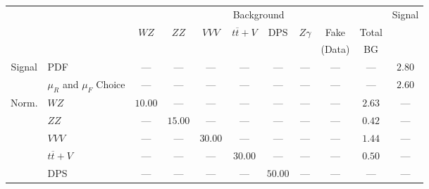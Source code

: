 \small\renewcommand{\tabcolsep}{4pt}
\begin{tabular}{|cl||ccccccc|c||c|}
\hline
 & & \multicolumn{8}{c||}{Background} & Signal \\ 
 & & $WZ$ & $ZZ$ & $VVV$ & $t\overline{t}+V$ & DPS & $Z\gamma$ & Fake & Total & \\ 
 & & &  &  &  &  &  & (Data) & BG & \\ 
\hline\hline
\multirow{2}{*}{Signal}
&PDF & --- & --- & --- & --- & --- & --- & --- & --- &  $2.80$ \\ 
\cline{2-11}
& $\mu_{R}$ and $\mu_{F}$ Choice &  --- &  --- &  --- &  --- &  --- &  --- &  --- &  --- & $2.60$\\ 
\hline
\multirow{5}{*}{Norm.}
& $WZ$ & $10.00$&  --- &  --- &  --- &  --- &  --- &  --- & $2.63$&  ---\\ 
\cline{2-11}
& $ZZ$ &  --- & $15.00$&  --- &  --- &  --- &  --- &  --- & $0.42$&  ---\\ 
\cline{2-11}
& $VVV$ &  --- &  --- & $30.00$&  --- &  --- &  --- &  --- & $1.44$&  ---\\ 
\cline{2-11}
& $t\overline{t}+V$ &  --- &  --- &  --- & $30.00$&  --- &  --- &  --- & $0.50$&  ---\\ 
\cline{2-11}
& DPS &  --- &  --- &  --- &  --- & $50.00$&  --- &  --- &  --- &  ---\\ 
\hline
\end{tabular}
